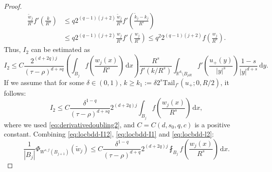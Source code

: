 \documentclass[11pt]{amsart}
\theoremstyle{plain}
\theoremstyle{definition}
\numberwithin{equation}{section}
\newcommand{\dx} {\,\mathrm{d}x}
\newcommand{\dy} {\,\mathrm{d}y}
\newcommand{\Rd}{\mathbb{R}^d}
\begin{document}
\begin{proof}
\begin{equation*}
\begin{split}
\frac{\tilde{w}_j}{R^s} f'\left( \frac{k}{R^s} \right)
&\leq q 2^{(q-1)(j+2)} \frac{\tilde{w}_j}{R^s} f'\left( \frac{\tilde{k}_j-k_j}{R^s} \right) \\
&\leq q 2^{(q-1)(j+2)} \frac{w_j}{R^s} f'\left( \frac{w_j}{R^s} \right) \leq q^2 2^{(q-1)(j+2)} f\left( \frac{w_j}{R^s} \right).
\end{split}
\end{equation*}
Thus, $I_2$ can be estimated as
\begin{equation*}
I_2 \leq C \frac{2^{(d+2q)j}}{(\tau-\rho)^{d+sq}} \left( \int_{B_j} f\left( \frac{w_j(x)}{R^s} \right) \dx \right) \frac{R^s}{f'(k/R^s)} \int_{\Rd \setminus B_{\rho R}} f'\left( \frac{u_+(y)}{|y|^s} \right) \frac{1-s}{|y|^{d+s}} \dy.
\end{equation*}
If we assume that for some $\delta \in (0,1)$, $k \geq k_1 := \delta 2^s \mathrm{Tail}_{f'}(u_+;0,R/2)$, it follows:
\begin{equation} \label{eq:locbdd-l2}
I_2 \le C \frac{\delta^{1-q}}{(\tau-\rho)^{d+sq}} 2^{(d+2q)j} \int_{B_j} f\left( \frac{w_j(x)}{R^s} \right) \dx,
\end{equation}
where we used \eqref{eq:derivativedoubling2}, and $C = C(d,s_0,q,c)$ is a positive constant. Combining \eqref{eq:locbdd-I12}, \eqref{eq:locbdd-I1} and \eqref{eq:locbdd-l2}:
\begin{equation} \label{eq:locbdd2}
\frac{1}{|B_j|} \Phi_{W^{s, f}(B_{j+1})}(\tilde{w}_j) \leq C \frac{\delta^{1-q}}{(\tau-\rho)^{d+q}} 2^{(d+2q)j} \fint_{B_j} f\left( \frac{w_j(x)}{R^s} \right) \dx.
\end{equation}


\end{proof}
\end{document}
